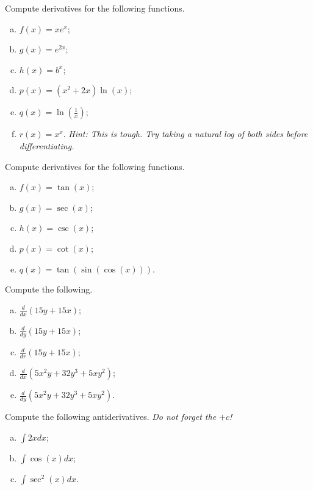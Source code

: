     \begin{problem}
    Compute derivatives for the following functions.
    \begin{enumerate}[(a)]
        \item $f(x)=xe^x$;
        \item $g(x)=e^{2x}$;
        \item $h(x)=b^x$;
        \item $p(x)=(x^2+2x)\ln(x)$;
        \item $q(x)=\ln\left(\frac{1}{x}\right)$;
        \item $r(x)=x^x$. \emph{Hint: This is tough. Try taking a natural log of both sides before differentiating.}
    \end{enumerate}
    \end{problem}
    
    \begin{problem}
    Compute derivatives for the following functions.
    \begin{enumerate}[(a)]
        \item $f(x)=\tan(x)$;
        \item $g(x)=\sec(x)$;
        \item $h(x)=\csc(x)$;
        \item $p(x)=\cot(x)$;
        \item $q(x)=\tan(\sin(\cos(x)))$.
    \end{enumerate}
    \end{problem}
    
    \begin{problem}
    Compute the following.
    \begin{enumerate}[(a)]
        \item $\displaystyle{\frac{d}{dx}\left(15y+15x\right)}$;
        \item $\displaystyle{\frac{d}{dy}\left(15y+15x\right)}$;
        \item $\displaystyle{\frac{d}{dr}\left(15y+15x\right)}$;
        \item $\displaystyle{\frac{d}{dx}\left(5x^2y+32y^3+5xy^2\right)}$;
        \item $\displaystyle{\frac{d}{dy}\left(5x^2y+32y^3+5xy^2\right)}$.
    \end{enumerate}
    \end{problem}
    
    \begin{problem}
    Compute the following antiderivatives. \emph{Do not forget the $+c$!}
    \begin{enumerate}[(a)]
        \item $\displaystyle{\int 2xdx}$;
        \item $\displaystyle{\int \cos(x)dx}$;
        \item $\displaystyle{\int \sec^2(x)dx}$.
    \end{enumerate}
    \end{problem}
    
